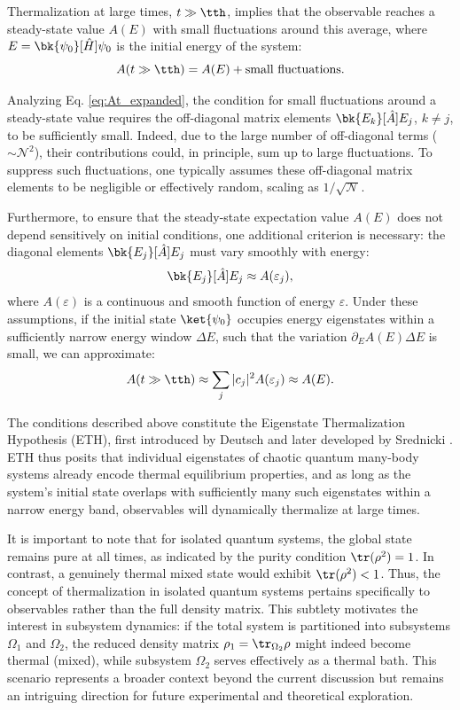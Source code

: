 Thermalization at large times, $t \gg \tth$, implies that the observable reaches a steady-state value $A(E)$ with small fluctuations around this average, where $E = \bk{\psi_0}[\hat{H}]{\psi_0}$ is the initial energy of the system:
\begin{equation}
A(t \gg \tth) = A(E) + \text{small fluctuations}.
\label{eq:thermal_limit}
\end{equation}

Analyzing Eq. \eqref{eq:At_expanded}, the condition for small fluctuations around a steady-state value requires the off-diagonal matrix elements $\bk{E_k}[\hat{A}]{E_j}$, $k\neq j$, to be sufficiently small. Indeed, due to the large number of off-diagonal terms ($\sim \mathcal{N}^2$), their contributions could, in principle, sum up to large fluctuations. To suppress such fluctuations, one typically assumes these off-diagonal matrix elements to be negligible or effectively random, scaling as $1/\sqrt{\mathcal{N}}$.

Furthermore, to ensure that the steady-state expectation value $A(E)$ does not depend sensitively on initial conditions, one additional criterion is necessary: the diagonal elements $\bk{E_j}[\hat{A}]{E_j}$ must vary smoothly with energy:
\begin{equation}
\bk{E_j}[\hat{A}]{E_j} \approx A(\varepsilon_j),
\end{equation}
where $A(\varepsilon)$ is a continuous and smooth function of energy $\varepsilon$. Under these assumptions, if the initial state $\ket{\psi_0}$ occupies energy eigenstates within a sufficiently narrow energy window $\Delta E$, such that the variation $\partial_E A(E)\Delta E$ is small, we can approximate:
\begin{equation}
A(t \gg \tth) \approx \sum_j |c_j|^2 A(\varepsilon_j) \approx A(E).
\end{equation}

The conditions described above constitute the Eigenstate Thermalization Hypothesis (ETH), first introduced by Deutsch \cite{deutsch_quantum_1991} and later developed by Srednicki \cite{srednicki_chaos_1994}. ETH thus posits that individual eigenstates of chaotic quantum many-body systems already encode thermal equilibrium properties, and as long as the system's initial state overlaps with sufficiently many such eigenstates within a narrow energy band, observables will dynamically thermalize at large times.

It is important to note that for isolated quantum systems, the global state remains pure at all times, as indicated by the purity condition $\tr(\rho^2) = 1$. In contrast, a genuinely thermal mixed state would exhibit $\tr(\rho^2) < 1$. Thus, the concept of thermalization in isolated quantum systems pertains specifically to observables rather than the full density matrix. This subtlety motivates the interest in subsystem dynamics: if the total system is partitioned into subsystems $\Omega_1$ and $\Omega_2$, the reduced density matrix $\rho_1 = \tr_{\Omega_2} \rho$ might indeed become thermal (mixed), while subsystem $\Omega_2$ serves effectively as a thermal bath. This scenario represents a broader context beyond the current discussion but remains an intriguing direction for future experimental and theoretical exploration.

